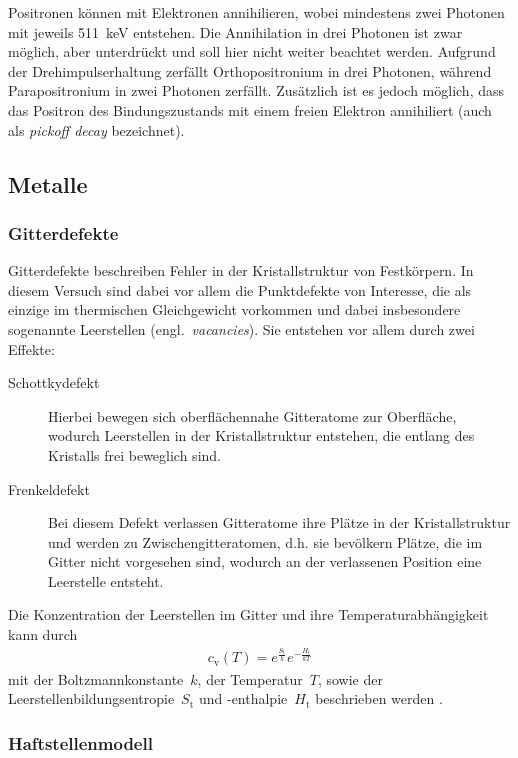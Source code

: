 \documentclass[11pt, a4paper]{article}
\numberwithin{equation}{section}
\begin{document}
Positronen können mit Elektronen annihilieren, wobei mindestens zwei Photonen mit jeweils \SI{511}{keV} entstehen.
Die Annihilation in drei Photonen ist zwar möglich, aber unterdrückt und soll hier nicht weiter beachtet werden.
Aufgrund der Drehimpulserhaltung zerfällt Orthopositronium in drei Photonen, während Parapositronium in zwei Photonen zerfällt.
Zusätzlich ist es jedoch möglich, dass das Positron des Bindungszustands mit einem freien Elektron annihiliert (auch als \textit{pickoff decay} bezeichnet). 

\subsection{Metalle}
\subsubsection{Gitterdefekte}
Gitterdefekte beschreiben Fehler in der Kristallstruktur von Festkörpern.
In diesem Versuch sind dabei vor allem die Punktdefekte von Interesse, die als einzige im thermischen Gleichgewicht vorkommen und dabei insbesondere sogenannte Leerstellen (engl.~\textit{vacancies}).
Sie entstehen vor allem durch zwei Effekte:
\begin{description}
	\item[Schottkydefekt] Hierbei bewegen sich oberflächennahe Gitteratome zur Oberfläche, wodurch Leerstellen in der Kristallstruktur entstehen, die entlang des Kristalls frei beweglich sind.
	\item[Frenkeldefekt] Bei diesem Defekt verlassen Gitteratome ihre Plätze in der Kristallstruktur und werden zu Zwischengitteratomen, d.h. sie bevölkern Plätze, die im Gitter nicht vorgesehen sind, wodurch an der verlassenen Position eine Leerstelle entsteht.
\end{description}
Die Konzentration der Leerstellen im Gitter und ihre Temperaturabhängigkeit kann durch
\begin{align}
c_\mathrm{v}(T) = e^{\frac{S_\mathrm{t}}{k}}e^{-\frac{H_\mathrm{t}}{k T}}
\label{eq:vac_conc}
\end{align}
mit der Boltzmannkonstante~$k$, der Temperatur~$T$, sowie der Leerstellenbildungsentropie~$S_\mathrm{t}$ und -enthalpie~$H_\mathrm{t}$ beschrieben werden \cite{add_infos}.

\subsubsection{Haftstellenmodell}
\end{document}
